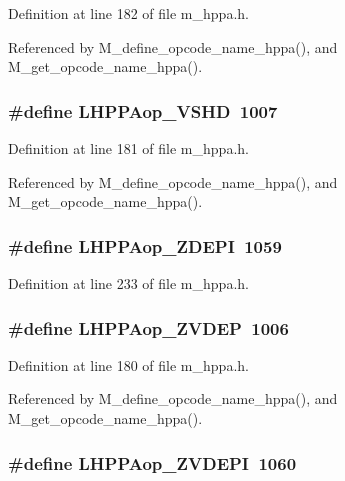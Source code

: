 Definition at line 182 of file m\_\-hppa.h.

Referenced by M\_\-define\_\-opcode\_\-name\_\-hppa(), and M\_\-get\_\-opcode\_\-name\_\-hppa().
\subsubsection{\setlength{\rightskip}{0pt plus 5cm}\#define LHPPAop\_\-VSHD~1007}\label{m__hppa_8h_f72a54d16cc1acf96bd3af0f4ffcb401}




Definition at line 181 of file m\_\-hppa.h.

Referenced by M\_\-define\_\-opcode\_\-name\_\-hppa(), and M\_\-get\_\-opcode\_\-name\_\-hppa().
\subsubsection{\setlength{\rightskip}{0pt plus 5cm}\#define LHPPAop\_\-ZDEPI~1059}\label{m__hppa_8h_73453afa5079c3f7431858a633b8797a}




Definition at line 233 of file m\_\-hppa.h.
\subsubsection{\setlength{\rightskip}{0pt plus 5cm}\#define LHPPAop\_\-ZVDEP~1006}\label{m__hppa_8h_d44c1d98a8c99c03f5840fcebad6a190}




Definition at line 180 of file m\_\-hppa.h.

Referenced by M\_\-define\_\-opcode\_\-name\_\-hppa(), and M\_\-get\_\-opcode\_\-name\_\-hppa().
\subsubsection{\setlength{\rightskip}{0pt plus 5cm}\#define LHPPAop\_\-ZVDEPI~1060}\label{m__hppa_8h_8cae9aaf4ad0d1e416c22092bb37b3a4}




